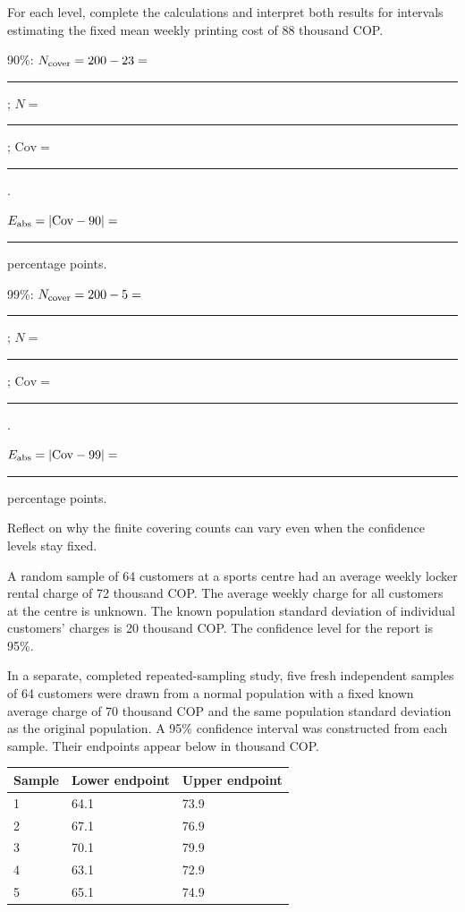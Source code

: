 \par For each level, complete the calculations and interpret both results for intervals estimating the fixed mean weekly printing cost of 88 thousand COP.
\par 90\%: $N_{\rm cover}=200-23=$ \rule{.5in}{.3pt}; $N=$ \rule{.4in}{.3pt}; $\mathrm{Cov}=$ \rule{1in}{.3pt}.
\par $E_{\rm abs}=|\mathrm{Cov}-90|=$ \rule{.7in}{.3pt} percentage points. 
\par 99\%: $N_{\rm cover}=200-5=$ \rule{.5in}{.3pt}; $N=$ \rule{.4in}{.3pt}; $\mathrm{Cov}=$ \rule{1in}{.3pt}.
\par $E_{\rm abs}=|\mathrm{Cov}-99|=$ \rule{.7in}{.3pt} percentage points. 
\par Reflect on why the finite covering counts can vary even when the confidence levels stay fixed.


A random sample of 64 customers at a sports centre had an average weekly locker rental charge of 72 thousand COP. The average weekly charge for all customers at the centre is unknown. The known population standard deviation of individual customers' charges is 20 thousand COP. The confidence level for the report is 95\%.

In a separate, completed repeated-sampling study, five fresh independent samples of 64 customers were drawn from a normal population with a fixed known average charge of 70 thousand COP and the same population standard deviation as the original population. A 95\% confidence interval was constructed from each sample. Their endpoints appear below in thousand COP.

\begin{center}\begin{tabular}{@{}lll@{}}\toprule
Sample & Lower endpoint & Upper endpoint\\\midrule
1 & 64.1 & 73.9\\
2 & 67.1 & 76.9\\
3 & 70.1 & 79.9\\
4 & 63.1 & 72.9\\
5 & 65.1 & 74.9\\
\bottomrule\end{tabular}\end{center}

